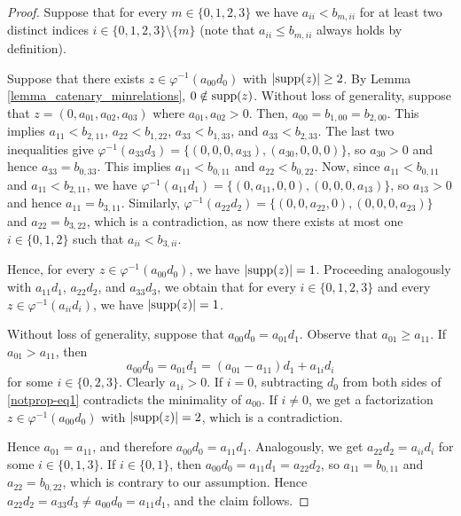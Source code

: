 \documentclass[12pt]{article}
\theoremstyle{remark}
\begin{document}
\begin{proof}
    Suppose that for every $m \in \{0,1,2,3\}$ we have $a_{ii} < b_{m,ii}$ for at least two distinct indices $i \in \{0,1,2,3\} \setminus \{m\}$ (note that $a_{ii} \leq b_{m,ii}$ always holds by definition). 
    
    Suppose that there exists $z \in \varphi^{-1}(a_{00} d_0)$ with $|\textup{supp}(z)| \geq 2$. By Lemma \ref{lemma_catenary_minrelations}, $0 \notin \textup{supp}(z)$. Without loss of generality, suppose that $z=(0,a_{01},a_{02},a_{03})$ where $a_{01},a_{02}>0$. Then, $a_{00} = b_{1,00} = b_{2,00}$. This implies $a_{11} < b_{2,11}$, $a_{22} < b_{1,22}$, $a_{33} < b_{1,33}$, and $a_{33} <b_{2,33}$. The last two inequalities give $\varphi^{-1}(a_{33}d_3) = \{(0,0,0,a_{33}),(a_{30},0,0,0)\}$, so $a_{30}>0$ and hence $a_{33} = b_{0,33}$. This implies $a_{11} < b_{0,11}$ and $a_{22} < b_{0,22}$. Now, since $a_{11} < b_{0,11}$ and $a_{11} < b_{2,11}$, we have $\varphi^{-1}(a_{11}d_1) = \{(0,a_{11},0,0),(0,0,0,a_{13})\}$, so $a_{13} > 0$ and hence $a_{11} = b_{3,11}$. Similarly, $\varphi^{-1}(a_{22}d_2) = \{(0,0,a_{22},0),(0,0,0,a_{23})\}$ and $a_{22} = b_{3,22}$, which is a contradiction, as now there exists at most one $i \in \{0,1,2\}$ such that $a_{ii} < b_{3,ii}$. 

    Hence, for every $z \in \varphi^{-1}(a_{00} d_0)$, we have $|\textup{supp}(z)| = 1$.
    Proceeding analogously with $a_{11}d_1$, $a_{22}d_2$, and $a_{33}d_3$, we obtain that for every $i \in \{0,1,2,3\}$ and every $z \in \varphi^{-1}(a_{ii} d_i)$, we have $|\textup{supp}(z)| = 1$.

    Without loss of generality, suppose that $a_{00}d_0 = a_{01}d_1$.
    Observe that $a_{01} \geq a_{11}$. If $a_{01} > a_{11}$, then
    \begin{equation}\label{notprop-eq1}
        a_{00}d_0 = a_{01}d_1 = ( a_{01}-a_{11})d_1 + a_{1i}d_i
    \end{equation}
    for some $i \in \{0,2,3\}$. Clearly $a_{1i} > 0$. If $i=0$, subtracting $d_0$ from both sides of \eqref{notprop-eq1} contradicts the minimality of $a_{00}$. If $i \neq 0$, we get a factorization $z \in  \varphi^{-1}(a_{00} d_0)$ with $|\textup{supp}(z)| = 2$, which is a contradiction. 
    
    Hence $a_{01} = a_{11}$, and therefore $a_{00}d_0 = a_{11}d_1$. Analogously, we get $a_{22}d_2 = a_{ii}d_i$ for some $i \in \{0,1,3\}$. If $i \in \{0,1\}$, then $a_{00}d_0 = a_{11}d_1 = a_{22}d_2$, so $a_{11} = b_{0,11}$ and $a_{22} = b_{0,22}$, which is contrary to our assumption. Hence $a_{22}d_2 = a_{33}d_3 \neq a_{00}d_0 = a_{11}d_1$, and the claim follows.
\end{proof}
\end{document}
